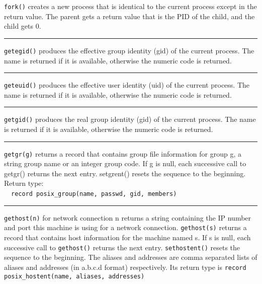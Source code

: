 \noindent
\texttt{fork()} creates a new process that is identical to the current process
except in the return value. The parent gets a return value that is the
PID of the child, and the child gets 0.

\bigskip\hrule\vspace{0.1cm}

\noindent
\texttt{getegid()} produces the effective group identity (gid) of the current
process. The name is returned if it is available, otherwise the numeric
code is returned.

\bigskip\hrule\vspace{0.1cm}

\noindent
\texttt{geteuid()} produces the effective user identity (uid) of the current
process. The name is returned if it is available, otherwise the numeric
code is returned.

\bigskip\hrule\vspace{0.1cm}

\noindent
\texttt{getgid()} produces the real group identity (gid) of the current process.
The name is returned if it is available, otherwise the numeric code is
returned.

\bigskip\hrule\vspace{0.1cm}

\noindent
\texttt{getgr(g)} returns a record that contains group file
information for group
g, a string group name or an integer group code. If g is null, each
successive call to getgr() returns the next entry. setgrent() resets
the sequence to the beginning. Return type:\\
\ \ \texttt{record posix\_group(name, passwd, gid, members)}

\bigskip\hrule\vspace{0.1cm}

\noindent
\texttt{gethost(n)} for network connection n returns a string containing
the IP number and port this machine is using for a network connection.
\texttt{gethost(s)} returns a record that contains host information for the
machine named s. If s is null, each successive call to \texttt{gethost()}
returns the next entry. \texttt{sethostent()} resets the sequence to the
beginning. The aliases and addresses are comma separated lists of
aliases and addresses (in a.b.c.d format) respectively. Its return
type is \texttt{record posix\_hostent(name, aliases, addresses)}

